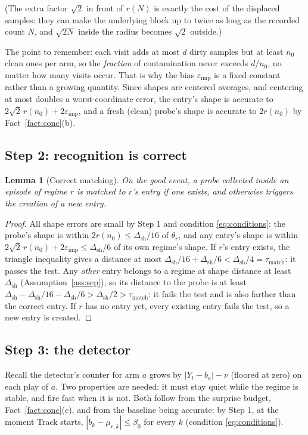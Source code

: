 \documentclass[11pt]{article}
\newtheorem{lemma}{Lemma}
\newcommand{\eimp}{\varepsilon_{\mathrm{imp}}}
\newcommand{\dsh}{\Delta_{\mathrm{sh}}}
\newcommand{\taum}{\tau_{\mathrm{match}}}
\begin{document}
(The extra factor $\sqrt2$ in front of $r(N)$ is exactly the cost of the displaced samples: they can make the underlying block up to twice as long as the recorded count $N$, and $\sqrt{2N}$ inside the radius becomes $\sqrt2$ outside.)

The point to remember: each visit adds at most $d$ dirty samples but at least $n_0$ clean ones per arm, so the \emph{fraction} of contamination never exceeds $d/n_0$, no matter how many visits occur. That is why the bias $\eimp$ is a fixed constant rather than a growing quantity. Since shapes are centered averages, and centering at most doubles a worst-coordinate error, the entry's shape is accurate to $2\sqrt2\,r(n_0)+2\eimp$, and a fresh (clean) probe's shape is accurate to $2r(n_0)$ by Fact~\ref{fact:conc}(b).

\subsection{Step 2: recognition is correct}

\begin{lemma}[Correct matching]
\label{lem:match}
On the good event, a probe collected inside an episode of regime $r$ is matched to $r$'s entry if one exists, and otherwise triggers the creation of a new entry.
\end{lemma}

\begin{proof}
All shape errors are small by Step 1 and condition \eqref{eq:conditions}: the probe's shape is within $2r(n_0)\le\dsh/16$ of $\theta_r$, and any entry's shape is within $2\sqrt2\,r(n_0)+2\eimp\le\dsh/6$ of its own regime's shape. If $r$'s entry exists, the triangle inequality gives a distance at most $\dsh/16+\dsh/6<\dsh/4=\taum$: it passes the test. Any \emph{other} entry belongs to a regime at shape distance at least $\dsh$ (Assumption~\ref{ass:sep}), so its distance to the probe is at least $\dsh-\dsh/16-\dsh/6>\dsh/2>\taum$: it fails the test and is also farther than the correct entry. If $r$ has no entry yet, every existing entry fails the test, so a new entry is created.
\end{proof}

\subsection{Step 3: the detector}

Recall the detector's counter for arm $a$ grows by $|Y_t-b_a|-\nu$ (floored at zero) on each play of $a$. Two properties are needed: it must stay quiet while the regime is stable, and fire fast when it is not. Both follow from the surprise budget, Fact~\ref{fact:conc}(c), and from the baseline being accurate: by Step 1, at the moment Track starts, $|b_k-\mu_{r,k}|\le\beta_0$ for every $k$ (condition \eqref{eq:conditions}).
\end{document}

